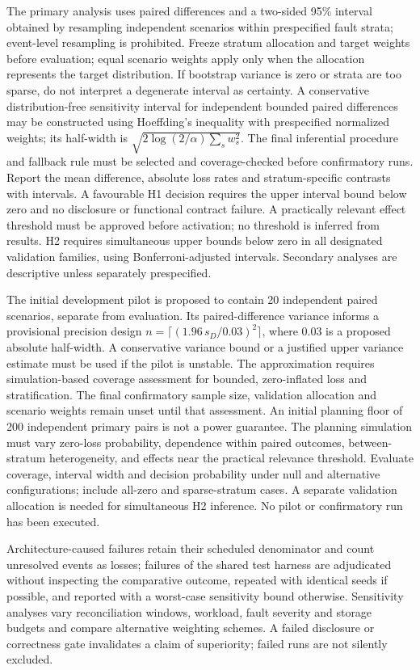 \documentclass[11pt,a4paper]{article}
\begin{document}
The primary analysis uses paired differences and a two-sided 95\% interval obtained by resampling independent scenarios within prespecified fault strata; event-level resampling is prohibited. Freeze stratum allocation and target weights before evaluation; equal scenario weights apply only when the allocation represents the target distribution. If bootstrap variance is zero or strata are too sparse, do not interpret a degenerate interval as certainty. A conservative distribution-free sensitivity interval for independent bounded paired differences may be constructed using Hoeffding's inequality with prespecified normalized weights; its half-width is $\sqrt{2\log(2/\alpha)\sum_s w_s^2}$. The final inferential procedure and fallback rule must be selected and coverage-checked before confirmatory runs. Report the mean difference, absolute loss rates and stratum-specific contrasts with intervals. A favourable H1 decision requires the upper interval bound below zero and no disclosure or functional contract failure. A practically relevant effect threshold must be approved before activation; no threshold is inferred from results. H2 requires simultaneous upper bounds below zero in all designated validation families, using Bonferroni-adjusted intervals. Secondary analyses are descriptive unless separately prespecified.

The initial development pilot is proposed to contain 20 independent paired scenarios, separate from evaluation. Its paired-difference variance informs a provisional precision design \(n=\lceil(1.96\,s_D/0.03)^2\rceil\), where 0.03 is a proposed absolute half-width. A conservative variance bound or a justified upper variance estimate must be used if the pilot is unstable. The approximation requires simulation-based coverage assessment for bounded, zero-inflated loss and stratification. The final confirmatory sample size, validation allocation and scenario weights remain unset until that assessment. An initial planning floor of 200 independent primary pairs is not a power guarantee. The planning simulation must vary zero-loss probability, dependence within paired outcomes, between-stratum heterogeneity, and effects near the practical relevance threshold. Evaluate coverage, interval width and decision probability under null and alternative configurations; include all-zero and sparse-stratum cases. A separate validation allocation is needed for simultaneous H2 inference. No pilot or confirmatory run has been executed.

Architecture-caused failures retain their scheduled denominator and count unresolved events as losses; failures of the shared test harness are adjudicated without inspecting the comparative outcome, repeated with identical seeds if possible, and reported with a worst-case sensitivity bound otherwise. Sensitivity analyses vary reconciliation windows, workload, fault severity and storage budgets and compare alternative weighting schemes. A failed disclosure or correctness gate invalidates a claim of superiority; failed runs are not silently excluded.
\end{document}
